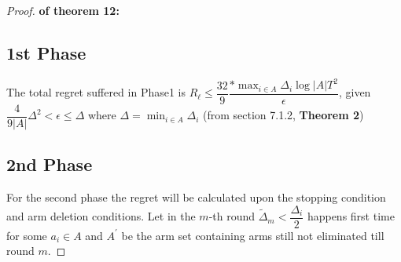 \begin{proof}\textbf{ of theorem 12:}

\subsection{1st Phase}
The total regret suffered in Phase1 is $R_{\ell}\leq \dfrac{32}{9}\dfrac{ * \max_{i\in A}{\Delta}_{i} \log |A|T^{2}}{\epsilon}$, given $\dfrac{4}{9|A|}\Delta^{2}<\epsilon\leq \Delta$ where $\Delta=\min_{i\in A}{\Delta_{i}}$ (from section 7.1.2, \textbf{Theorem 2})
\subsection{2nd Phase}
For the second phase the regret will be calculated upon the stopping condition and arm deletion conditions. Let in the $m$-th round $\tilde{\Delta}_{m}<\dfrac{\Delta_{i}}{2}$ happens first time for some $a_{i}\in A$ and $A^{'}$ be the arm set containing arms still not eliminated till round $m$.


\end{proof}
